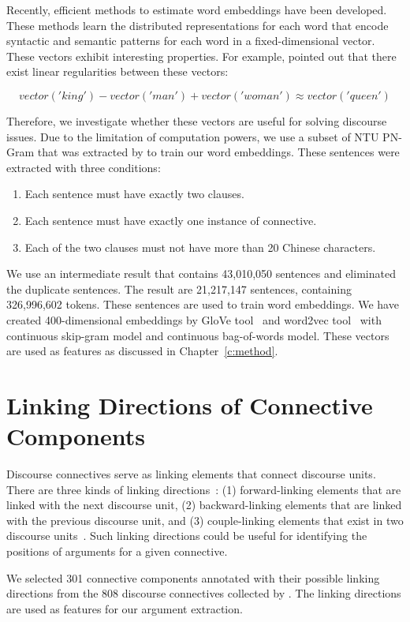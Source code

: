 Recently, efficient methods to estimate word embeddings have been developed.
These methods learn the distributed representations for each word that encode
syntactic and semantic patterns for each word in a fixed-dimensional vector.
These vectors exhibit interesting properties. For example,
\cite{mikolov2013linguistic} pointed out that there exist linear regularities
between these vectors:

$$ vector('king') - vector('man') + vector('woman') \approx vector('queen') $$

Therefore, we investigate whether these vectors are useful for solving
discourse issues. Due to the limitation of computation powers, we use
a subset of NTU PN-Gram that was extracted by \cite{huang2014interpretation}
to train our word embeddings. These sentences were extracted with three conditions:

\begin{enumerate}
\item Each sentence must have exactly two clauses.
\item Each sentence must have exactly one instance of connective.
\item Each of the two clauses must not have more than 20 Chinese characters.
\end{enumerate}

We use an intermediate result that contains 43,010,050 sentences and eliminated
the duplicate sentences. The result are 21,217,147 sentences, containing
326,996,602 tokens. These sentences are used to train word embeddings.
We have created 400-dimensional embeddings by GloVe tool~\citep{pennington2014glove}
and word2vec tool~\citep{mikolov2013efficient,mikolov2013distributed} with
continuous skip-gram model and continuous bag-of-words model.
These vectors are used as features as discussed in Chapter~\ref{c:method}.


\section{Linking Directions of Connective Components}

Discourse connectives serve as linking elements that connect discourse units.
There are three kinds of linking directions~\citep{li1989mandarin}:
(1) forward-linking elements that are linked with the next discourse unit,
(2) backward-linking elements that are linked with the previous discourse unit,
and (3) couple-linking elements that exist in two discourse units~\citep{chen1994contextual}.
Such linking directions could be useful for identifying the positions of arguments
for a given connective.

We selected 301 connective components annotated with their possible
linking directions from the 808 discourse connectives collected by
\cite{huang2014interpretation}. The linking directions are used as features
for our argument extraction.
